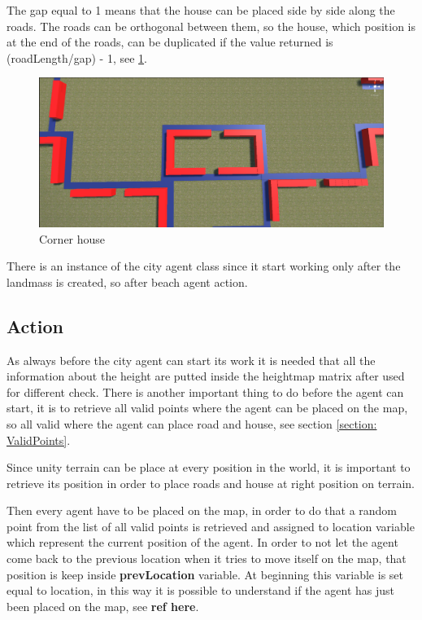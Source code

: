 \documentclass[12pt]{article}
\begin{document}
\begin{itemize}
        The gap equal to 1 means that the house can be placed side by side along the roads. The roads can be orthogonal between them, so the house, which position is 
        at the end of the roads, can be duplicated if the value returned is (roadLength/gap) - 1, see \ref{fig:cornerHouse}.
        
        \begin{figure}
            \centering
            \includegraphics[scale = 0.19]{images/Corner house.png}
            \caption{Corner house}
            \label{fig:cornerHouse}
        \end{figure}
        
    \end{itemize}

    There is an instance of the city agent class since it start working only after the landmass is created, so after beach agent action.

    \subsection{Action} \label{seciton:action}
    As always before the city agent can start its work it is needed that all the information about the height are putted inside the heightmap matrix after used
    for different check. There is another important thing to do before the agent can start, it is to retrieve all valid points where the agent can be placed on the
    map, so all valid where the agent can place road and house, see section \ref{section: ValidPoints}.

    Since unity terrain can be place at every position in the world, it is important to retrieve its position in order to place roads and house at right position on 
    terrain.

    Then every agent have to be placed on the map, in order to do that a random point from the list of all valid points is retrieved and assigned to location variable
    which represent the current position of the agent. In order to not let the agent come back to the previous location when it tries to move itself on the map, that
    position is keep inside \textbf{prevLocation} variable. At beginning this variable is set equal to location, in this way it is possible to understand if the agent
    has just been placed on the map, see \textbf{ref here}.
\end{document}
